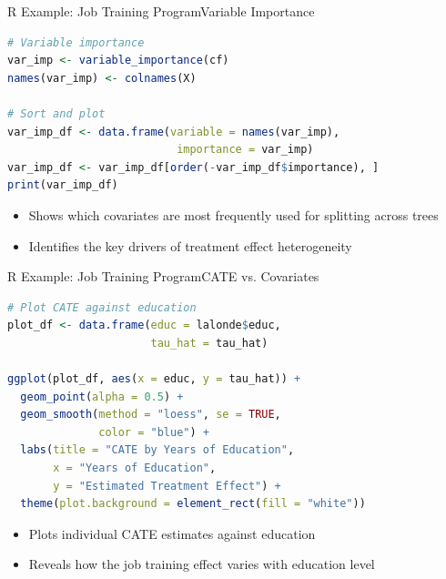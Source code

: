 \documentclass[hyperref={pdfpagelabels=false}]{beamer}
\begin{document}
\begin{frame}[fragile]{R Example: Job Training Program}{Variable Importance}
\begin{lstlisting}[language=R]
# Variable importance
var_imp <- variable_importance(cf)
names(var_imp) <- colnames(X)

# Sort and plot
var_imp_df <- data.frame(variable = names(var_imp),
                          importance = var_imp)
var_imp_df <- var_imp_df[order(-var_imp_df$importance), ]
print(var_imp_df)
\end{lstlisting}
	\begin{itemize}
		\item Shows which covariates are most frequently used for splitting across trees
		\vspace{0.2cm}
		\item Identifies the key drivers of treatment effect heterogeneity
	\end{itemize}
\end{frame}




\begin{frame}[fragile]{R Example: Job Training Program}{CATE vs. Covariates}
\begin{lstlisting}[language=R]
# Plot CATE against education
plot_df <- data.frame(educ = lalonde$educ,
                      tau_hat = tau_hat)

ggplot(plot_df, aes(x = educ, y = tau_hat)) +
  geom_point(alpha = 0.5) +
  geom_smooth(method = "loess", se = TRUE,
              color = "blue") +
  labs(title = "CATE by Years of Education",
       x = "Years of Education",
       y = "Estimated Treatment Effect") +
  theme(plot.background = element_rect(fill = "white"))
\end{lstlisting}
	\begin{itemize}
		\item Plots individual CATE estimates against education
		\vspace{0.2cm}
		\item Reveals how the job training effect varies with education level
	\end{itemize}
\end{frame}
\end{document}
